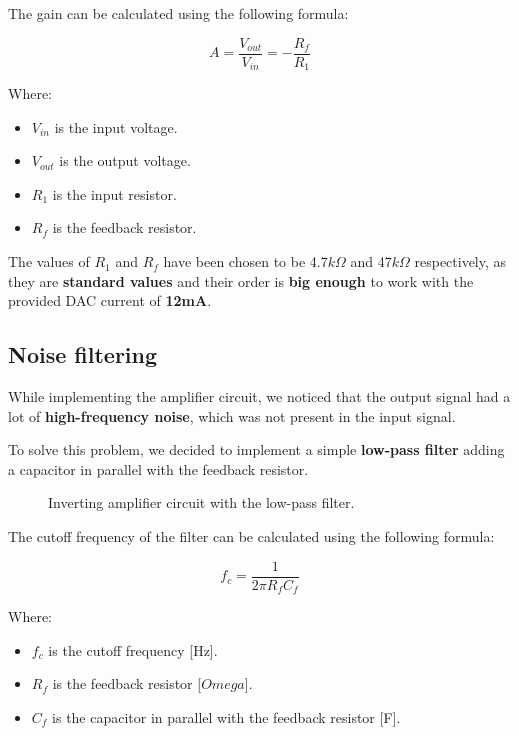 \begin{samepage}
    The gain can be calculated using the following formula:
    \nopagebreak

    \begin{equation}
        A = \frac{V_{out}}{V_{in}} = -\frac{R_f}{R_1}
    \end{equation}
    \nopagebreak

    Where:
    \nopagebreak

    \begin{itemize}
        \item $V_{in}$ is the input voltage.
        \item $V_{out}$ is the output voltage.
        \item $R_1$ is the input resistor.
        \item $R_f$ is the feedback resistor.
    \end{itemize}
\end{samepage}

The values of $R_1$ and $R_f$ have been chosen to be 4.7$k\Omega$ and 47$k\Omega$ respectively, as they are \textbf{standard values} and their order is \textbf{big enough} to work with the provided DAC current of \textbf{12mA}.

\subsection{Noise filtering}
While implementing the amplifier circuit, we noticed that the output signal had a lot of \textbf{high-frequency noise}, which was not present in the input signal.

\begin{samepage}
    To solve this problem, we decided to implement a simple \textbf{low-pass filter} adding a capacitor in parallel with the feedback resistor.
    \nopagebreak

    \begin{figure}[H]
        \centering
        \resizebox{.6\linewidth}{!}{}
        \caption{Inverting amplifier circuit with the low-pass filter.}
        \label{fig:non-inv_ampl_filter}
    \end{figure}
\end{samepage}

\begin{samepage}
    The cutoff frequency of the filter can be calculated using the following formula:
    \nopagebreak

    \begin{equation}
        f_c = \frac{1}{2\pi R_f C_f}
    \end{equation}
    \nopagebreak

    Where:
    \nopagebreak
    \begin{itemize}
        \item $f_c$ is the cutoff frequency [Hz].
        \item $R_f$ is the feedback resistor [$Omega$].
        \item $C_f$ is the capacitor in parallel with the feedback resistor [F].
    \end{itemize}
\end{samepage}


